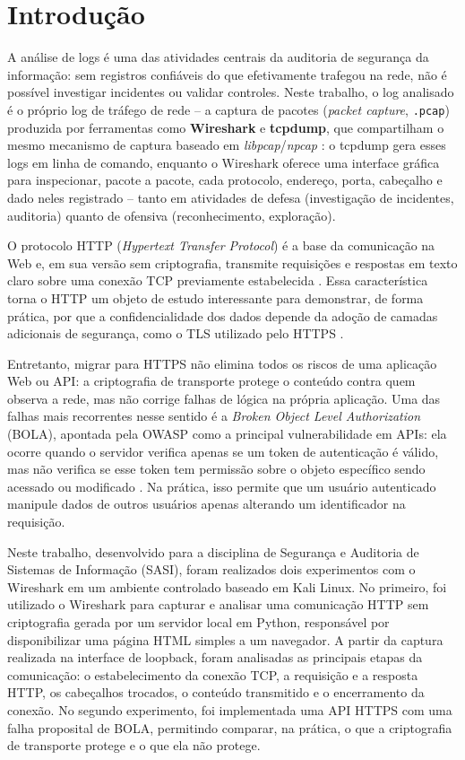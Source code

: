 \documentclass[12pt]{article}
\begin{document}
\section{Introdução}

A análise de logs é uma das atividades centrais da auditoria de segurança
da informação: sem registros confiáveis do que efetivamente trafegou na
rede, não é possível investigar incidentes ou validar controles. Neste
trabalho, o log analisado é o próprio log de tráfego de rede -- a captura
de pacotes (\textit{packet capture}, \texttt{.pcap}) produzida por
ferramentas como \textbf{Wireshark} e \textbf{tcpdump}, que compartilham o
mesmo mecanismo de captura baseado em \textit{libpcap}/\textit{npcap}
\cite{wireshark2024}: o tcpdump gera esses logs em linha de comando,
enquanto o Wireshark oferece uma interface gráfica para inspecionar,
pacote a pacote, cada protocolo, endereço, porta, cabeçalho e dado neles
registrado -- tanto em atividades de defesa (investigação de incidentes,
auditoria) quanto de ofensiva (reconhecimento, exploração).

O protocolo HTTP (\textit{Hypertext Transfer Protocol}) é a base da
comunicação na Web e, em sua versão sem criptografia, transmite requisições
e respostas em texto claro sobre uma conexão TCP previamente estabelecida
\cite{fielding2014,postel1981}. Essa característica torna o HTTP um objeto
de estudo interessante para demonstrar, de forma prática, por que a
confidencialidade dos dados depende da adoção de camadas adicionais de
segurança, como o TLS utilizado pelo HTTPS \cite{rescorla2018}.

Entretanto, migrar para HTTPS não elimina todos os riscos de uma aplicação
Web ou API: a criptografia de transporte protege o conteúdo contra quem
observa a rede, mas não corrige falhas de lógica na própria aplicação. Uma
das falhas mais recorrentes nesse sentido é a \textit{Broken Object Level
Authorization} (BOLA), apontada pela OWASP como a principal vulnerabilidade
em APIs: ela ocorre quando o servidor verifica apenas se um token de
autenticação é válido, mas não verifica se esse token tem permissão sobre o
objeto específico sendo acessado ou modificado \cite{owasp-api2023}. Na
prática, isso permite que um usuário autenticado manipule dados de outros
usuários apenas alterando um identificador na requisição.

Neste trabalho, desenvolvido para a disciplina de Segurança e Auditoria de
Sistemas de Informação (SASI), foram realizados dois experimentos com o
Wireshark em um ambiente controlado baseado em Kali Linux. No primeiro,
foi utilizado o Wireshark para capturar e analisar uma comunicação HTTP sem
criptografia gerada por um servidor local em Python, responsável por
disponibilizar uma página HTML simples a um navegador. A partir da captura
realizada na interface de loopback, foram analisadas as principais etapas
da comunicação: o estabelecimento da conexão TCP, a requisição e a
resposta HTTP, os cabeçalhos trocados, o conteúdo transmitido e o
encerramento da conexão. No segundo experimento, foi implementada uma API
HTTPS com uma falha proposital de BOLA, permitindo comparar, na prática, o
que a criptografia de transporte protege e o que ela não protege.
\end{document}
